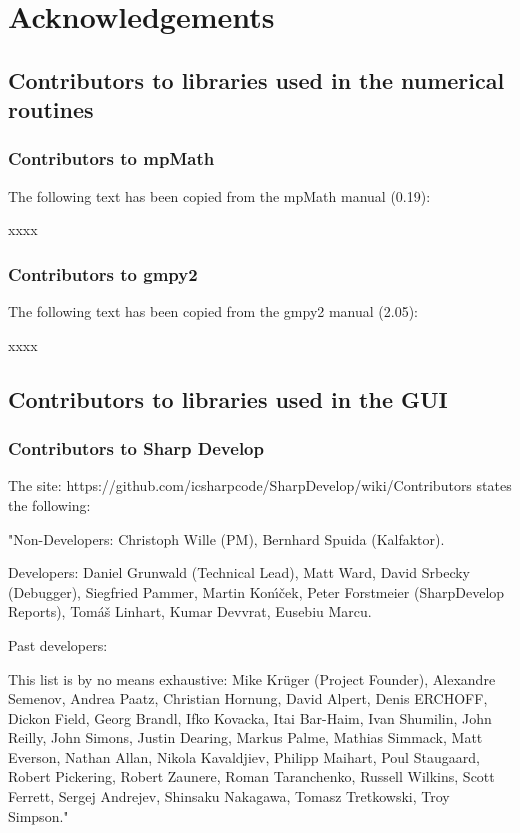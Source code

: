 \chapter{Acknowledgements} 

\section{Contributors to libraries used in the numerical routines}


\subsection{Contributors to mpMath}
\label{Contributors to mpMath}
The following text has been copied from the mpMath manual (0.19):

\vpara
xxxx



\subsection{Contributors to gmpy2}
\label{Contributors to gmpy2}
The following text has been copied from the gmpy2 manual (2.05):

\vpara
xxxx



\section{Contributors to libraries used in the GUI}

\subsection{Contributors to Sharp Develop}
\label{Contributors to SharpDevelop}

The site: 
https://github.com/icsharpcode/SharpDevelop/wiki/Contributors
states the following:

\vpara
"Non-Developers: 
Christoph Wille (PM), 
Bernhard Spuida (Kalfaktor).

\vpara
Developers: 
Daniel Grunwald (Technical Lead), 
Matt Ward, 
David Srbecky (Debugger), 
Siegfried Pammer, 
Martin Kon\'{\i}\v{c}ek, 
Peter Forstmeier (SharpDevelop Reports), 
Tom\'{a}\v{s} Linhart, 
Kumar Devvrat, 
Eusebiu Marcu.

\vpara
Past developers: 

This list is by no means exhaustive:
Mike Kr\"{u}ger (Project Founder), 
Alexandre Semenov, 
Andrea Paatz, 
Christian Hornung, 
David Alpert, 
Denis ERCHOFF, 
Dickon Field, 
Georg Brandl, 
Ifko Kovacka, 
Itai Bar-Haim, 
Ivan Shumilin, 
John Reilly, 
John Simons, 
Justin Dearing, 
Markus Palme, 
Mathias Simmack, 
Matt Everson, 
Nathan Allan, 
Nikola Kavaldjiev, 
Philipp Maihart, 
Poul Staugaard, 
Robert Pickering, 
Robert Zaunere, 
Roman Taranchenko, 
Russell Wilkins, 
Scott Ferrett, 
Sergej Andrejev, 
Shinsaku Nakagawa, 
Tomasz Tretkowski, 
Troy Simpson."




